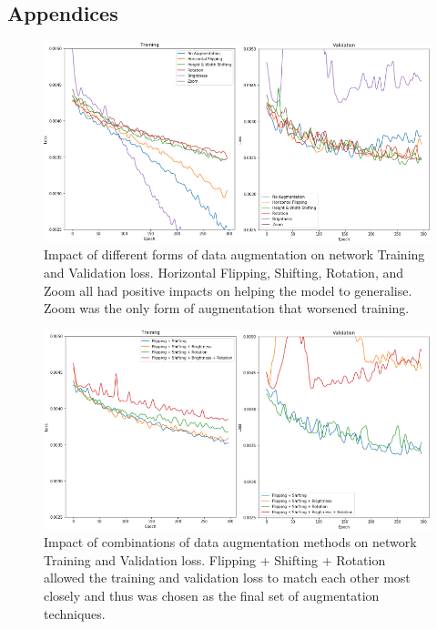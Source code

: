 \documentclass{l4proj}
\begin{document}
\begin{appendices}

\chapter{Appendices}

\begin{figure}[h]
    \centering
    \includegraphics[width=0.9\linewidth]{images/AugmentationTesting.PNG}    

    \caption{Impact of different forms of data augmentation on network Training and Validation loss. Horizontal Flipping, Shifting, Rotation, and Zoom all had positive impacts on helping the model to generalise. Zoom was the only form of augmentation that worsened training.}

    \label{fig:augmentation_testing} 
\end{figure}

\begin{figure}[h]
    \centering
    \includegraphics[width=0.9\linewidth]{images/AugmentationFurtherTesting.PNG}    

    \caption{Impact of combinations of data augmentation methods on network Training and Validation loss. Flipping + Shifting + Rotation allowed the training and validation loss to match each other most closely and thus was chosen as the final set of augmentation techniques.}


\end{figure}
\end{appendices}
\end{document}

